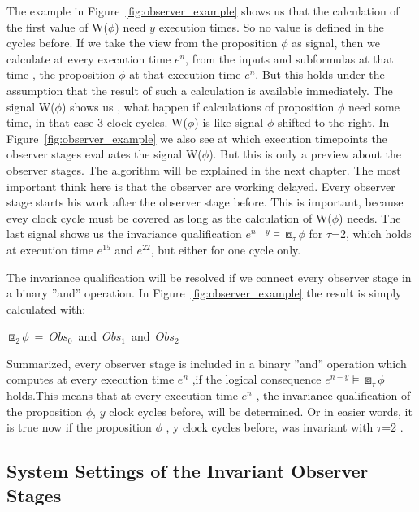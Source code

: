 The example in Figure~\ref{fig:observer_example} shows us that the calculation of the first value of W($\phi$) need $y$
execution times. So no value is defined in the cycles before. If we take the view from the proposition $\phi$ as signal, then we calculate
at every execution time $e^n$, from the inputs and subformulas at that time , the proposition $\phi$ at that execution time $e^n$.
But this holds under the assumption that the result of such a calculation is available immediately.
The signal W($\phi$) shows us , what happen if calculations of proposition $\phi$ need some time, in that case 3 clock cycles.
W($\phi$) is like signal $\phi$ shifted to the right.
In Figure~\ref{fig:observer_example} we also see at which execution timepoints the observer stages evaluates the signal W($\phi$).
But this is only a preview about the observer stages. The algorithm will be explained in the next chapter.
The most important think here is that the observer are working delayed. Every observer stage starts his work after the observer stage before.
This is important, because evey clock cycle must be covered as long as the calculation of W($\phi$) needs. 
The last signal shows us the invariance qualification $e^{n-y} \models \boxbox_\tau \phi$ for $\tau$=2, which holds at execution time $e^{15}$ and $e^{22}$,
but either for one cycle only.

The invariance qualification will be resolved if we connect every observer stage in a binary ''and'' operation.
In Figure~\ref{fig:observer_example} the result is simply calculated with:
\newline
\begin{center} 
\mbox{$\boxbox_2 \phi$ =  $Obs_0$ and  $Obs_1$  and  $Obs_2$}
\end{center}
\newpage
Summarized,  every observer stage is included in a binary ''and'' operation which computes at every execution time $e^n$
,if the logical consequence $e^{n-y} \models \boxbox_\tau \phi$ holds.This means that at every execution time  $e^n$ , 
the invariance qualification of the proposition $\phi$, $y$ clock cycles before, will be determined.
Or in easier words, it is true now if the proposition $\phi$ , y clock cycles before, was invariant with $\tau$=2 .
\newline

\subsection{System Settings of the Invariant Observer Stages}

